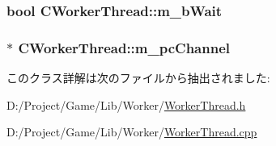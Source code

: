 \subsubsection[{m\+\_\+b\+Wait}]{\setlength{\rightskip}{0pt plus 5cm}bool C\+Worker\+Thread\+::m\+\_\+b\+Wait\hspace{0.3cm}{\ttfamily [private]}}\label{class_c_worker_thread_ac692019a76899c582fd0759080108e0b}
\hypertarget{class_c_worker_thread_a7168bcaeb8c06da52320dfe49bc4b427}{}
\subsubsection[{m\+\_\+pc\+Channel}]{$\ast$ C\+Worker\+Thread\+::m\+\_\+pc\+Channel\hspace{0.3cm}{\ttfamily [private]}}\label{class_c_worker_thread_a7168bcaeb8c06da52320dfe49bc4b427}


このクラス詳解は次のファイルから抽出されました\+:\begin{DoxyCompactItemize}
\item 
D\+:/\+Project/\+Game/\+Lib/\+Worker/\hyperlink{_worker_thread_8h}{Worker\+Thread.\+h}\item 
D\+:/\+Project/\+Game/\+Lib/\+Worker/\hyperlink{_worker_thread_8cpp}{Worker\+Thread.\+cpp}\end{DoxyCompactItemize}
